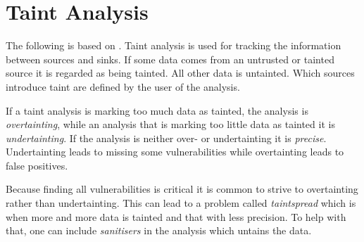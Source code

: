\section{Taint Analysis}
The following is based on \citet[Part 3]{schwartz2010all}.
Taint analysis is used for tracking the information between sources and sinks.
If some data comes from an untrusted or tainted source it is regarded as being tainted.
All other data is untainted.
Which sources introduce taint are defined by the user of the analysis.

If a taint analysis is marking too much data as tainted, the analysis is \textit{overtainting}, while an analysis that is marking too little data as tainted it is \textit{undertainting}.
If the analysis is neither over- or undertainting it is \textit{precise}. 
Undertainting leads to missing some vulnerabilities while overtainting leads to false positives.

Because finding all vulnerabilities is critical it is common to strive to overtainting rather than undertainting.
This can lead to a problem called \textit{taintspread} which is when more and more data is tainted and that with less precision.
To help with that, one can include \textit{sanitisers} in the analysis which untains the data.
